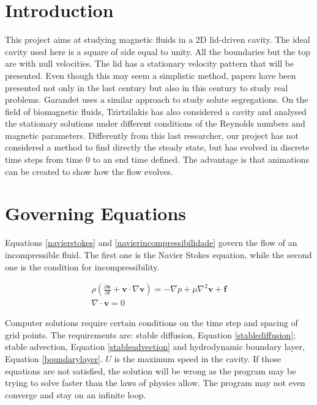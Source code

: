 \documentclass[journal]{IEEEtran}
\begin{document}
\section{Introduction}
This project aims at studying magnetic fluids in a 2D lid-driven cavity. The ideal cavity used here is a square of side equal to unity. All the boundaries but the top are with null velocities. The lid has a stationary velocity pattern that will be presented. Even though this may seem a simplistic method, papers have been presented not only in the last century but also in this century to study real problems. Garandet \cite{Garandet2012149} uses a similar approach to study solute segregations. On the field of biomagnetic fluids, Tzirtzilakis \cite{Tzirtzilakis2013} has also considered a cavity and analysed the stationary solutions under different conditions of the Reynolds numbers and magnetic parameters. Differently from this last researcher, our project has not considered a method to find directly the steady state, but has evolved in discrete time steps from time 0 to an end time defined. The advantage is that animations can be created to show how the flow evolves. 

\section{Governing Equations}
Equations \ref{navierstokes} and \ref{navierincompressibilidade} govern the flow of an incompressible fluid. The first one is the Navier Stokes equation, while the second one is the condition for incompressibility.

\begin{eqnarray}
\rho\left( \frac{\partial {\textbf{v}}}{\partial t}+\textbf{v}\cdot\nabla \textbf{v} \right)=-\nabla p+\mu\nabla^2 \textbf{v} + \textbf{f}\label{navierstokes}\\
\nabla\cdot\textbf{v}=0\label{navierincompressibilidade}
\end{eqnarray}

Computer solutions require certain conditions on the time step and spacing of grid points. The requirements are: stable diffusion, Equation \ref{stablediffusion}; stable advection, Equation \ref{stableadvection} and hydrodynamic boundary layer, Equation \ref{boundarylayer}. $U$ is the maximum speed in the cavity. If those equations are not satisfied, the solution will be wrong as the program may be trying to solve faster than the laws of physics allow. The program may not even converge and stay on an infinite loop.
\end{document}
